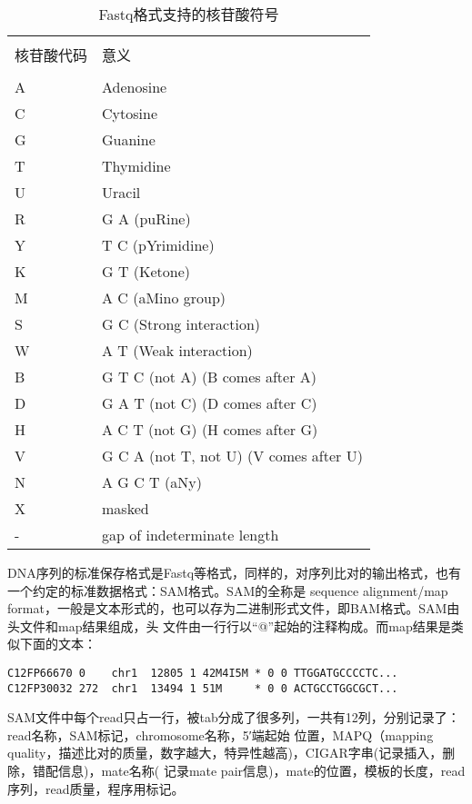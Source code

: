 \begin{table}[htbp]
    \caption{Fastq格式支持的核苷酸符号}
    \label{tab:tabatcg}
    \centering
    \begin{tabular}{ll}
        \hline\\
        核苷酸代码&意义\\
        \hline\\
        A & Adenosine \\
        C & Cytosine \\
        G & Guanine \\
        T & Thymidine \\
        U & Uracil \\
        R & G A (puRine) \\
        Y & T C (pYrimidine) \\
        K & G T (Ketone) \\
        M & A C (aMino group) \\
        S & G C (Strong interaction)\\
        W & A T (Weak interaction) \\
        B & G T C (not A) (B comes after A)\\
        D & G A T (not C) (D comes after C) \\
        H & A C T (not G) (H comes after G) \\
        V & G C A (not T, not U) (V comes after U)\\
        N & A G C T (aNy)\\
        X & masked \\
        - & gap of indeterminate length
    \end{tabular}
\end{table}

DNA序列的标准保存格式是Fastq等格式，同样的，对序列比对的输出格式，也有一个约定的标准数据格式：SAM格式\cite{li2009sequence}。SAM的全称是
sequence alignment/map format，一般是文本形式的，也可以存为二进制形式文件，即BAM格式。SAM由头文件和map结果组成，头
文件由一行行以“@”起始的注释构成。而map结果是类似下面的文本：

\begin{verbatim}
C12FP66670 0    chr1  12805 1 42M4I5M * 0 0 TTGGATGCCCCTC...
C12FP30032 272  chr1  13494 1 51M     * 0 0 ACTGCCTGGCGCT...
\end{verbatim}

SAM文件中每个read只占一行，被tab分成了很多列，一共有12列，分别记录了：read名称，SAM标记，chromosome名称，5′端起始
位置，MAPQ（mapping quality，描述比对的质量，数字越大，特异性越高)，CIGAR字串(记录插入，删除，错配信息)，mate名称(
记录mate pair信息)，mate的位置，模板的长度，read序列，read质量，程序用标记。

